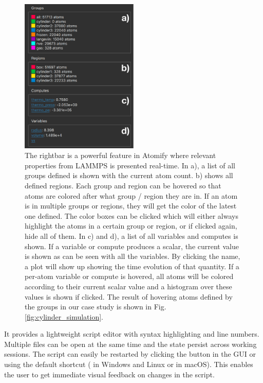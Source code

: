 \documentclass[aps,pre,twocolumn,letterpaper,floatfix,nofootinbib]{revtex4}
\begin{document}
\begin{figure}
	\centering
	\includegraphics[width=0.5\textwidth]{figures/rightbar.pdf}
	\caption{
		The rightbar is a powerful feature in Atomify where relevant
		properties from LAMMPS is presented real-time.
		In a), a list of all groups defined is shown with the current atom count.
		b) shows all defined regions. Each group and region can be hovered so that atoms
		are colored after what group / region they are in. If an atom is in multiple
		groups or regions, they will get the color of the latest one defined.
		The color boxes can be clicked which will either always highlight the atoms in a certain group or region,
		or if clicked again, hide all of them.
		In c) and d), a list of all variables and computes is shown. If a variable or compute
		produces a scalar, the current value is shown as can be seen with all the variables.
		By clicking the name, a plot will show up showing the time evolution of that quantity.
		If a per-atom variable or compute is hovered, all atoms will be colored according to their
		current scalar value and a histogram over these values is shown if clicked.
		The result of hovering atoms defined by the groups in our case study is shown in Fig. \ref{fig:cylinder_simulation}.
    }
	\label{fig:rightbar}
\end{figure}

It provides a lightweight script editor with syntax highlighting and line numbers.
Multiple files can be open at the same time and the state persist across working sessions.
The script can easily be restarted by clicking the button in the GUI or using
the default shortcut ( in Windows and Linux or  in macOS).
This enables the user to get immediate visual feedback on changes in the script.
\end{document}
